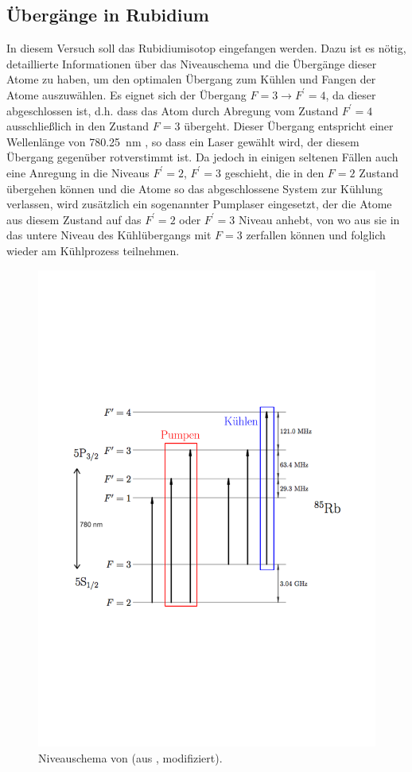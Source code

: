\documentclass[11pt, a4paper]{article}
\numberwithin{equation}{section}
\begin{document}
\subsection{Übergänge in Rubidium}
\label{sec:rb_uebergaenge}

In diesem Versuch soll das Rubidiumisotop  eingefangen werden.
Dazu ist es nötig, detaillierte Informationen über das Niveauschema und die Übergänge dieser Atome zu haben, um den optimalen Übergang zum Kühlen und Fangen der Atome auszuwählen.
Es eignet sich der Übergang $F=3 \rightarrow F^\prime=4$, da dieser abgeschlossen ist, d.h. dass das Atom durch Abregung vom Zustand $F^\prime=4$ ausschließlich in den Zustand $F=3$ übergeht.
Dieser Übergang entspricht einer Wellenlänge von \SI{780.25}{nm} \cite{steck}, so dass ein Laser gewählt wird, der diesem Übergang gegenüber rotverstimmt ist.
Da jedoch in einigen seltenen Fällen auch eine Anregung in die Niveaus $F^\prime=2$, $F^\prime=3$ geschieht, die in den $F=2$ Zustand übergehen können und die Atome so das abgeschlossene System zur Kühlung verlassen, wird zusätzlich ein sogenannter Pumplaser eingesetzt, der die Atome aus diesem Zustand auf das $F^\prime=2$ oder $F^\prime=3$ Niveau anhebt, von wo aus sie in das untere Niveau des Kühlübergangs mit $F=3$ zerfallen können und folglich wieder am Kühlprozess teilnehmen.
\begin{figure}[htb]
	\centering
	\includegraphics[width=.65\textwidth]{./figures/theory/levelscheme}
	\caption{Niveauschema von  (aus \cite{script}, modifiziert).}
\end{figure}
\end{document}
